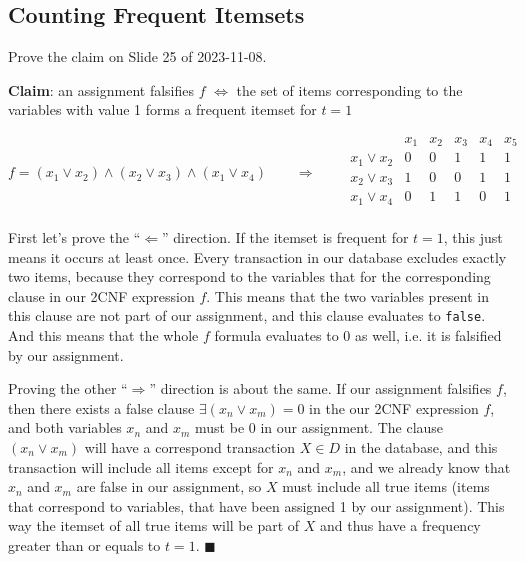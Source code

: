 \documentclass{article}
\begin{document}
  \subsection{Counting Frequent Itemsets}
  \begin{centerframebox}
    Prove the claim on Slide 25 of 2023-11-08.

    \textbf{Claim}: an assignment falsifies $f$ $\iff$ the set of items corresponding to the variables with value 1 forms a frequent itemset for $t = 1$

    \[ f = (x_1 \lor x_2) \land (x_2 \lor x_3) \land (x_1 \lor x_4) \qquad\Rightarrow\qquad
      \begin{matrix}
        & x_1 & x_2 & x_3 & x_4 & x_5 \\
        x_1 \lor x_2 & 0 & 0 & 1 & 1 & 1 \\
        x_2 \lor x_3 & 1 & 0 & 0 & 1 & 1 \\
        x_1 \lor x_4 & 0 & 1 & 1 & 0 & 1 \\
      \end{matrix}
    \]
  \end{centerframebox}
  First let's prove the ``$\Leftarrow$'' direction.
  If the itemset is frequent for $t = 1$, this just means it occurs at least once.
  Every transaction in our database excludes exactly two items, because they correspond to the variables that for the corresponding clause in our 2CNF expression $f$.
  This means that the two variables present in this clause are not part of our assignment, and this clause evaluates to \texttt{false}.
  And this means that the whole $f$ formula evaluates to 0 as well, i.e. it is falsified by our assignment.

  Proving the other ``$\Rightarrow$'' direction is about the same.
  If our assignment falsifies $f$, then there exists a false clause $\exists (x_n \lor x_m) = 0$ in the our 2CNF expression $f$,
  and both variables $x_n$ and $x_m$ must be 0 in our assignment.
  The clause $(x_n \lor x_m)$ will have a correspond transaction $X \in D$ in the database,
  and this transaction will include all items except for $x_n$ and $x_m$,
  and we already know that $x_n$ and $x_m$ are false in our assignment,
  so $X$ must include all true items (items that correspond to variables, that have been assigned 1 by our assignment).
  This way the itemset of all true items will be part of $X$ and thus have a frequency greater than or equals to $t = 1$.
  $\blacksquare$
\end{document}
